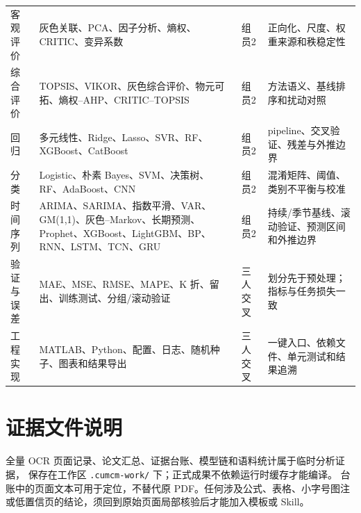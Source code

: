 \documentclass[UTF8,a4paper,12pt]{ctexart}
\begin{document}
\begin{longtable}{p{2.1cm}p{5.0cm}p{2.0cm}p{5.5cm}}
客观评价 & 灰色关联、PCA、因子分析、熵权、CRITIC、变异系数 & 组员2 & 正向化、尺度、权重来源和秩稳定性\\
综合评价 & TOPSIS、VIKOR、灰色综合评价、物元可拓、熵权--AHP、CRITIC--TOPSIS & 组员2 & 方法语义、基线排序和扰动对照\\
回归 & 多元线性、Ridge、Lasso、SVR、RF、XGBoost、CatBoost & 组员2 & pipeline、交叉验证、残差与外推边界\\
分类 & Logistic、朴素 Bayes、SVM、决策树、RF、AdaBoost、CNN & 组员2 & 混淆矩阵、阈值、类别不平衡与校准\\
时间序列 & ARIMA、SARIMA、指数平滑、VAR、GM(1,1)、灰色--Markov、长期预测、Prophet、XGBoost、LightGBM、BP、RNN、LSTM、TCN、GRU & 组员2 & 持续/季节基线、滚动验证、预测区间和外推边界\\
验证与误差 & MAE、MSE、RMSE、MAPE、K 折、留出、训练测试、分组/滚动验证 & 三人交叉 & 划分先于预处理；指标与任务损失一致\\
工程实现 & MATLAB、Python、配置、日志、随机种子、图表和结果导出 & 三人交叉 & 一键入口、依赖文件、单元测试和结果追溯\\
\bottomrule
\end{longtable}

\section{证据文件说明}

全量 OCR 页面记录、论文汇总、证据台账、模型链和语料统计属于临时分析证据，
保存在工作区 \texttt{.cumcm-work/} 下；正式成果不依赖运行时缓存才能编译。
台账中的页面文本可用于定位，不替代原 PDF。任何涉及公式、表格、小字号图注
或低置信页的结论，须回到原始页面局部核验后才能加入模板或 Skill。
\end{document}

